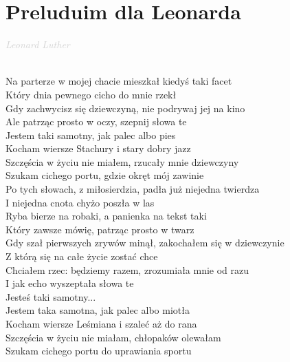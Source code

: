 \documentclass[a5paper, 10pt]{book}
\begin{document}
\section{Preluduim dla Leonarda}\textcolor{lightgray}{\textit{Leonard Luther}}\\~\\
\begin{minipage}[t]{0.81\textwidth}
  Na parterze w mojej chacie mieszkał kiedyś taki facet\\
  Który dnia pewnego cicho do mnie rzekł\\
  Gdy zachwycisz się dziewczyną, nie podrywaj jej na kino\\
  Ale patrząc prosto w oczy, szepnij słowa te\\

  \hspace*{4mm}Jestem taki samotny, jak palec albo pies\\
  \hspace*{4mm}Kocham wiersze Stachury i stary dobry jazz\\
  \hspace*{4mm}Szczęścia w życiu nie miałem, rzucały mnie dziewczyny\\
  \hspace*{4mm}Szukam cichego portu, gdzie okręt mój zawinie\\

  Po tych słowach, z miłosierdzia, padła już niejedna twierdza\\
  I niejedna cnota chyżo poszła w las\\
  Ryba bierze na robaki, a panienka na tekst taki\\
  Który zawsze mówię, patrząc prosto w twarz\\

  Gdy szał pierwszych zrywów minął, zakochałem się w dziewczynie \\
  Z którą się na całe życie zostać chce\\
  Chciałem rzec: będziemy razem, zrozumiała mnie od razu\\
  I jak echo wyszeptała słowa te\\

  \hspace*{4mm}Jesteś taki samotny...\\

  \hspace*{4mm}Jestem taka samotna, jak palec albo miotła\\
  \hspace*{4mm}Kocham wiersze Leśmiana i szaleć aż do rana\\
  \hspace*{4mm}Szczęścia w życiu nie miałam, chłopaków olewałam\\
  \hspace*{4mm}Szukam cichego portu do uprawiania sportu\\
\end{minipage}
\end{document}
